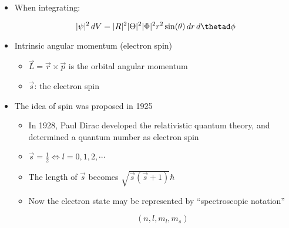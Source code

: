 \begin{itemize}
  \item When integrating:

    $$|\psi|^2\,dV=|R|^2|\Theta|^2|\Phi|^2r^2\sin(\theta)\,dr\,d\thetad\phi$$

  \item Intrinsic angular momentum (electron spin)

    \begin{itemize}

      \item $\vec{L}=\vec{r}\times\vec{p}$ is the orbital angular momentum

      \item $\vec{s}$: the electron spin

    \end{itemize}

  \item The idea of spin was proposed in 1925

    \begin{itemize}

      \item In 1928, Paul Dirac developed the relativistic quantum theory, and determined a  quantum number as electron spin

      \item $\vec{s}=\frac{1}{2}\Longleftrightarrow l = 0,1,2,\cdots$

      \item The length of $\vec{s}$ becomes $\sqrt{\vec{s}(\vec{s}+1)}\hbar$

      \item Now the electron state may be represented by ``spectroscopic notation''

        $$(n,l,m_l,m_s)$$

    \end{itemize}

\end{itemize}



